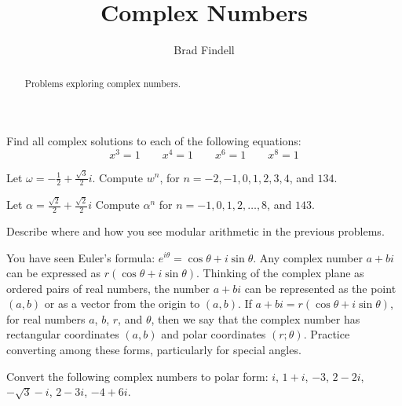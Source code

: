 \documentclass[space,nooutcomes]{ximera}
\title{Complex Numbers}
\author{Brad Findell}
\begin{document}
\begin{abstract}
Problems exploring complex numbers.   
\end{abstract}
\maketitle


\begin{problem}
Find all complex solutions to each of the following equations: 
\[
x^3=1 \qquad x^4=1 \qquad x^6 = 1 \qquad x^8 = 1
\]
\vfill
\end{problem}
\newpage 

\begin{problem}
Let $\omega=-\tfrac{1}{2}+\tfrac{\sqrt{3}}{2}i$.  Compute $w^n$, for $n = -2, -1, 0, 1, 2, 3, 4$, and $134$.  
\vfill
\end{problem}

\begin{problem} 
Let $\alpha=\tfrac{\sqrt{2}}{2}+\tfrac{\sqrt{2}}{2}i$ Compute $\alpha^n$ for $n = -1, 0, 1, 2, \dots, 8$, and $143$.  
\vfill
\end{problem}


\begin{problem}
Describe where and how you see modular arithmetic in the previous problems.
\vfill
\end{problem}

\newpage


You have seen Euler's formula: $e^{i\theta}=\cos\theta +i\sin\theta$.  Any complex number $a+bi$ can be expressed as $r(\cos\theta +i\sin\theta)$.  Thinking of the complex plane as ordered pairs of real numbers, the number $a+bi$ can be represented as the point $(a,b)$ or as a vector from the origin to
$(a,b)$.  If $a+bi = r(\cos\theta +i\sin\theta)$, for real numbers $a$, $b$, $r$, and $\theta$, then we say that the complex number has rectangular coordinates $(a,b)$ and polar coordinates $(r;\theta)$.  Practice converting among these forms, particularly for special angles.


\begin{problem}
Convert the following complex numbers to polar form: $i$, $1 + i$,  $-3$, $2 - 2i$, $-\sqrt{3}-i$, $2 - 3i$, $-4 + 6i$.  
\vfill 
\end{problem}
\end{document}
